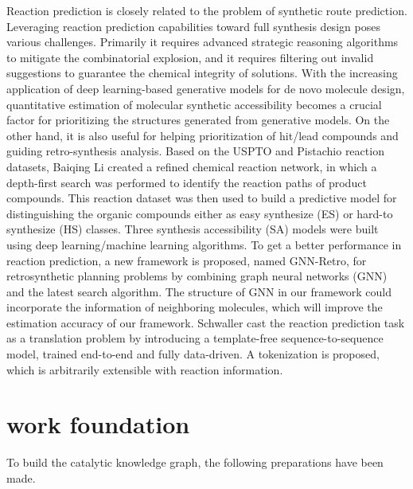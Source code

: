 \documentclass[%
 aip,
 jmp,%
 amsmath,amssymb,
 reprint,%
]{revtex4-2}
\begin{document}
Reaction prediction is closely related to the problem of synthetic route prediction. 
Leveraging reaction prediction capabilities toward full synthesis design poses various challenges. 
Primarily it requires advanced strategic reasoning algorithms to mitigate the combinatorial explosion, 
and it requires filtering out invalid suggestions to guarantee the chemical integrity of solutions\cite{ravitz2013data}.
With the increasing application of deep learning-based generative models for de novo
molecule design, quantitative estimation of molecular synthetic accessibility becomes
a crucial factor for prioritizing the structures generated from generative models. On the 
other hand, it is also useful for helping prioritization of hit/lead compounds and guiding 
retro-synthesis analysis. Based on the USPTO and Pistachio reaction datasets,
Baiqing Li created a refined chemical reaction network, in which a depth-first search 
was performed to identify the reaction paths of product compounds. This 
reaction dataset was then used to build a predictive model for distinguishing the organic 
compounds either as easy synthesize (ES) or hard-to synthesize (HS) classes. Three 
synthesis accessibility (SA) models were built using deep learning/machine learning 
algorithms\cite{li2022prediction}.
To get a better performance in reaction prediction, a new framework is proposed, named GNN-Retro, for
retrosynthetic planning problems by combining graph neural
networks (GNN) and the latest search algorithm. 
The structure of GNN in our framework could incorporate the information of neighboring molecules, 
which will improve the estimation accuracy of our framework\cite{han2022gnn}.
Schwaller cast the reaction
prediction task as a translation problem by introducing a template-free sequence-to-sequence model,
trained end-to-end and fully data-driven. A tokenization is proposed, which is arbitrarily extensible with
reaction information\cite{schwaller2018found}.


\section{work foundation}
To build the catalytic knowledge graph, the following preparations have been made.
\end{document}
